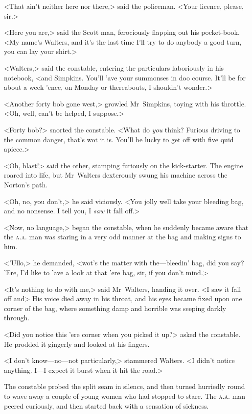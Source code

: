 <That ain't neither here nor there,> said the policeman. <Your licence, please, sir.>

<Here you are,> said the Scott man, ferociously flapping out his pocket-book. <My name's Walters, and it's the last time I'll try to do anybody a good turn, you can lay your shirt.>

<Walters,> said the constable, entering the particulars laboriously in his notebook, <and Simpkins. You'll 'ave your summonses in doo course. It'll be for about a week 'ence, on Monday or thereabouts, I shouldn't wonder.>

<Another forty bob gone west,> growled Mr~Simpkins, toying with his throttle. <Oh, well, can't be helped, I suppose.>

<Forty bob?> snorted the constable. <What do \emph{you} think? Furious driving to the common danger, that's wot it is. You'll be lucky to get off with five quid apiece.>

<Oh, blast!> said the other, stamping furiously on the kick-starter. The engine roared into life, but Mr~Walters dexterously swung his machine across the Norton's path.

<Oh, no, you don't,> he said viciously. <You jolly well take your bleeding bag, and no nonsense. I tell you, I \emph{saw} it fall off.>

<Now, no language,> began the constable, when he suddenly became aware that the \textsc{a.a.} man was staring in a very odd manner at the bag and making signs to him.

<'Ullo,> he demanded, <wot's the matter with the—bleedin' bag, did you say? 'Ere, I'd like to 'ave a look at that 'ere bag, sir, if you don't mind.>

<It's nothing to do with me,> said Mr~Walters, handing it over. <I saw it fall off and\longdash> His voice died away in his throat, and his eyes became fixed upon one corner of the bag, where something damp and horrible was seeping darkly through.

<Did you notice this 'ere corner when you picked it up?> asked the constable. He prodded it gingerly and looked at his fingers.

<I don't know—no—not particularly,> stammered Walters. <I didn't notice anything. I—I expect it burst when it hit the road.>

The constable probed the split seam in silence, and then turned hurriedly round to wave away a couple of young women who had stopped to stare. The \textsc{a.a.} man peered curiously, and then started back with a sensation of sickness.

